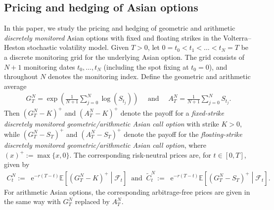\documentclass[10pt,a4paper,reqno]{amsart}
\newcommand*{\E}{\mathop{} \mathrm{e}}
\theoremstyle{plain}
\theoremstyle{definition}
\theoremstyle{remark}
\theoremstyle{example}
\begin{document}
\subsection{Pricing and hedging of Asian options}
In this paper, we study the pricing and hedging of geometric and arithmetic \emph{discretely monitored} Asian options with fixed and floating strikes in the Volterra--Heston stochastic volatility model. Given $T > 0$, let $0=t_0<t_1<\dots<t_N=T$ be a discrete monitoring grid for the underlying Asian option. The grid consists of $N+1$ monitoring dates $t_0,\dots,t_N$ (including the spot fixing at $t_0=0$), and throughout $N$ denotes the monitoring index. Define the geometric and arithmetic average
\begin{align}\label{eq: intro 1}
    G_T^N = \exp\left( \frac{1}{N+1}\sum_{j=0}^{N} \log(S_{t_j}) \right) \quad \text{ and } \quad A_T^N = \frac{1}{N+1}\sum_{j=0}^{N} S_{t_j}.
\end{align}
Then $(G^N_T-K)^+$ and $(A^N_T - K)^+$ denote the payoff for a \emph{fixed-strike discretely monitored geometric/arithmetic Asian call option} with strike $K>0$, while $(G^N_T - S_T)^+$ and $(A^N_T - S_T)^+$ denote the payoff for the \emph{floating-strike discretely monitored geometric/arithmetic Asian call option}, where $(x)^+:=\max\{x,0\}$. The corresponding risk-neutral prices are, for $t \in [0,T]$, given by
\begin{align*}
    C^N_{t} := \E^{-r(T-t)}\mathbb{E}\left[(G^N_T-K)^+\middle|\mathcal{F}_{t}\right]
    \ \text{ and } \ \widetilde{C}^N_{t} := \E^{-r(T-t)}\mathbb{E}\left[(G^N_T-S_T)^+\middle|\mathcal{F}_{t}\right].
\end{align*}
For arithmetic Asian options, the corresponding arbitrage-free prices are given in the same way with $G_T^N$ replaced by $A_T^N$.
\end{document}
